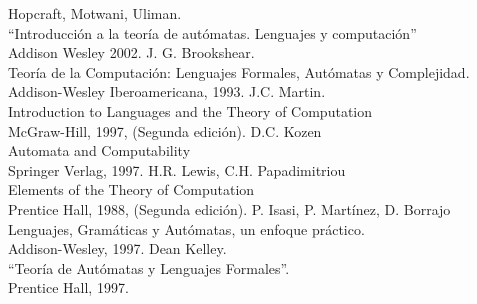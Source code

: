 \documentclass[12pt,a4paper,spanish]{book}
\begin{document}
\backmatter
\begin{thebibliography}{XXX}
\bibitem{}Hopcraft, Motwani, Uliman.\\
``Introducci\'on a la teor\'ia de aut\'omatas. Lenguajes y computaci\'on''\\
Addison Wesley 2002.
\bibitem{}J. G. Brookshear.\\
Teor\'ia de la Computaci\'on: Lenguajes Formales, Aut\'omatas y Complejidad.\\
Addison-Wesley Iberoamericana, 1993.
\bibitem{}J.C. Martin.\\
Introduction to Languages and the Theory of Computation\\
McGraw-Hill, 1997, (Segunda edici\'on).
\bibitem{}D.C. Kozen\\
Automata and Computability\\
Springer Verlag, 1997.
\bibitem{}H.R. Lewis, C.H. Papadimitriou\\
Elements of the Theory of Computation\\
Prentice Hall, 1988, (Segunda edici\'on).
\bibitem{}P. Isasi, P. Mart\'inez, D. Borrajo\\
Lenguajes, Gram\'aticas y Aut\'omatas, un enfoque pr\'actico.\\
Addison-Wesley, 1997.
\bibitem{}Dean Kelley.\\
``Teor\'ia de Aut\'omatas y Lenguajes Formales''.\\
Prentice Hall, 1997.
\bibitem{}
\end{thebibliography}
\end{document}
